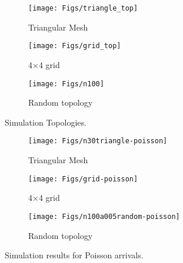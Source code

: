 \documentclass[10pt,journal,compsoc]{IEEEtran}
\begin{document}
\begin{figure*}[t!]
        \centering
        \begin{subfigure}[b]{0.3\linewidth}
                \texttt{[image: Figs/triangle\_top]}
                \caption{Triangular Mesh}
                \label{fig:triangle_top}
        \end{subfigure}\qquad
        \begin{subfigure}[b]{0.3\linewidth}
                \texttt{[image: Figs/grid\_top]}
                \caption{4$\times$4 grid}
                \label{fig:grid_top}
        \end{subfigure}
	\qquad
	\begin{subfigure}[b]{0.3\linewidth}
\texttt{[image: Figs/n100]}
                \caption{Random topology}
                \label{fig:random_top}
        \end{subfigure}  
        \caption{Simulation Topologies.}
        \label{fig:topologies}
\end{figure*}

\begin{figure*}[t!]
        \centering
        \begin{subfigure}[b]{0.3\linewidth}
                \texttt{[image: Figs/n30triangle-poisson]}
                \caption{Triangular Mesh}
                \label{fig:triangle_result}
        \end{subfigure}\quad
        \begin{subfigure}[b]{0.3\linewidth}
                \texttt{[image: Figs/grid-poisson]}
                \caption{4$\times$4 grid}
                \label{fig:grid_result}
        \end{subfigure}
	  \quad
	    \begin{subfigure}[b]{0.3\linewidth}
\texttt{[image: Figs/n100a005random-poisson]}
                \caption{Random topology}
                \label{fig:random_result}
        \end{subfigure}  
        \caption{Simulation results for Poisson arrivals.}
        \label{fig:results_poi}
\end{figure*}
\end{document}
